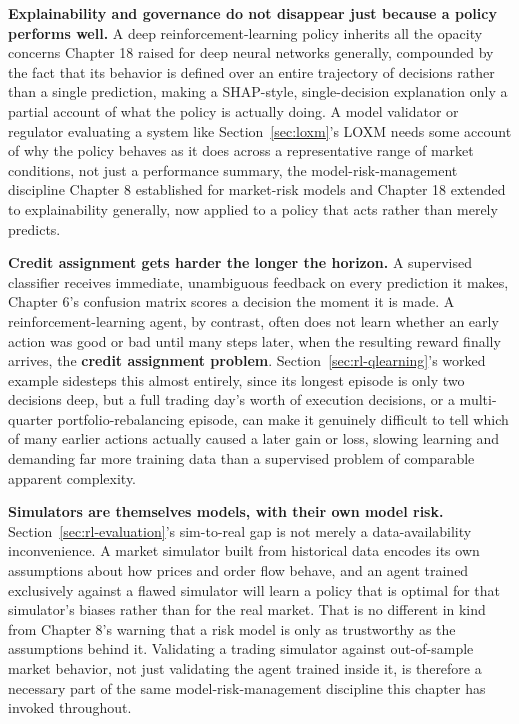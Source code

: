 \documentclass[../ai_in_finance]{subfiles}
\begin{document}
\textbf{Explainability and governance do not disappear just because a policy performs well.} A deep reinforcement-learning policy inherits all the opacity concerns Chapter 18 raised for deep neural networks generally, compounded by the fact that its behavior is defined over an entire trajectory of decisions rather than a single prediction, making a SHAP-style, single-decision explanation only a partial account of what the policy is actually doing. A model validator or regulator evaluating a system like Section~\ref{sec:loxm}'s LOXM needs some account of why the policy behaves as it does across a representative range of market conditions, not just a performance summary, the model-risk-management discipline Chapter 8 established for market-risk models and Chapter 18 extended to explainability generally, now applied to a policy that acts rather than merely predicts.

\textbf{Credit assignment gets harder the longer the horizon.} A supervised classifier receives immediate, unambiguous feedback on every prediction it makes, Chapter 6's confusion matrix scores a decision the moment it is made. A reinforcement-learning agent, by contrast, often does not learn whether an early action was good or bad until many steps later, when the resulting reward finally arrives, the \textbf{credit assignment problem}. Section~\ref{sec:rl-qlearning}'s worked example sidesteps this almost entirely, since its longest episode is only two decisions deep, but a full trading day's worth of execution decisions, or a multi-quarter portfolio-rebalancing episode, can make it genuinely difficult to tell which of many earlier actions actually caused a later gain or loss, slowing learning and demanding far more training data than a supervised problem of comparable apparent complexity.

\textbf{Simulators are themselves models, with their own model risk.} Section~\ref{sec:rl-evaluation}'s sim-to-real gap is not merely a data-availability inconvenience. A market simulator built from historical data encodes its own assumptions about how prices and order flow behave, and an agent trained exclusively against a flawed simulator will learn a policy that is optimal for that simulator's biases rather than for the real market. That is no different in kind from Chapter 8's warning that a risk model is only as trustworthy as the assumptions behind it. Validating a trading simulator against out-of-sample market behavior, not just validating the agent trained inside it, is therefore a necessary part of the same model-risk-management discipline this chapter has invoked throughout.
\end{document}
